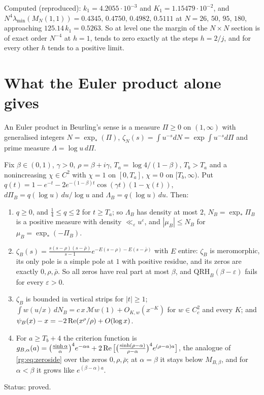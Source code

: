 Computed (reproduced): $k_1=4.2055\cdot10^{-3}$ and $K_1=1.15479\cdot10^{-2}$, and $N^4\lambda_{\min}(M_N(1,1))=0.4345,\,0.4750,\,0.4982,\,0.5111$ at $N=26,\,50,\,95,\,180$, approaching $125.14\,k_1=0.5263$. So at level one the margin of the $N\times N$ section is of exact order $N^{-4}$ at $h=1$, tends to zero exactly at the steps $h=2/j$, and for every other $h$ tends to a positive limit.

\section{What the Euler product alone gives}\label{rg:sec:euler}

An Euler product in Beurling's sense is a measure $\Pi\ge0$ on $(1,\infty)$ with generalised integers $N=\exp_*(\Pi)$, $\zeta_N(s)=\int u^{-s}dN=\exp\int u^{-s}d\Pi$ and prime measure $\Lambda=\log u\,d\Pi$.

\begin{theorem}\label{rg:thm:beurling}
Fix $\beta\in(0,1)$, $\gamma>0$, $\rho=\beta+i\gamma$, $T_a=\log4/(1-\beta)$, $T_b>T_a$ and a nonincreasing $\chi\in C^2$ with $\chi=1$ on $[0,T_a]$, $\chi=0$ on $[T_b,\infty)$. Put $q(t)=1-e^{-t}-2e^{-(1-\beta)t}\cos(\gamma t)(1-\chi(t))$, $d\Pi_B=q(\log u)\,du/\log u$ and $\Lambda_B=q(\log u)\,du$. Then:
\begin{enumerate}
\item[(a)] $q\ge0$, and $\frac14\le q\le2$ for $t\ge T_a$; so $\Lambda_B$ has density at most $2$, $N_B=\exp_*\Pi_B$ is a positive measure with density $\ll_\varepsilon u^\varepsilon$, and $|\mu_B|\le N_B$ for $\mu_B=\exp_*(-\Pi_B)$.
\item[(b)] $\zeta_B(s)=\frac{s(s-\rho)(s-\bar\rho)}{s-1}e^{-E(s-\rho)-E(s-\bar\rho)}$ with $E$ entire: $\zeta_B$ is meromorphic, its only pole is a simple pole at $1$ with positive residue, and its zeros are exactly $0,\rho,\bar\rho$. So all zeros have real part at most $\beta$, and $\mathrm{QRH}_B(\beta-\varepsilon)$ fails for every $\varepsilon>0$.
\item[(c)] $\zeta_B$ is bounded in vertical strips for $|t|\ge1$; $\int w(u/x)\,dN_B=c\,x\,\mathcal Mw(1)+O_{K,w}(x^{-K})$ for $w\in C^2_c$ and every $K$; and $\psi_B(x)-x=-2\operatorname{Re}(x^\rho/\rho)+O(\log x)$.
\item[(d)] For $a\ge T_b+4$ the criterion function is $g_{B,\alpha}(a)=\big(\frac{\sinh\alpha}\alpha\big)^4e^{-\alpha a}+2\operatorname{Re}\big[\big(\frac{\sinh(\rho-\alpha)}{\rho-\alpha}\big)^4e^{(\rho-\alpha)a}\big]$, the analogue of \eqref{rg:eq:zeroside} over the zeros $0,\rho,\bar\rho$; at $\alpha=\beta$ it stays below $M_{B,\beta}$, and for $\alpha<\beta$ it grows like $e^{(\beta-\alpha)a}$.
\end{enumerate}
Status: proved.
\end{theorem}

